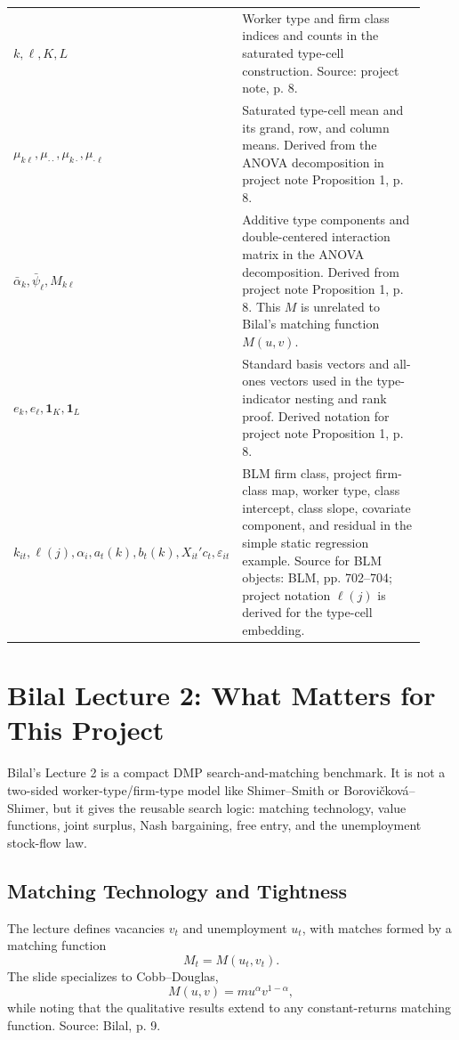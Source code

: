 \documentclass[11pt]{article}
\newcommand{\1}{\mathbf{1}}
\begin{document}
\begin{center}
\begin{tabular}{>{\raggedright\arraybackslash}p{0.24\linewidth}
                >{\raggedright\arraybackslash}p{0.68\linewidth}}
$k,\ell,K,L$ & Worker type and firm class indices and counts in the saturated type-cell construction. Source: project note, p. 8. \\
$\mu_{k\ell},\mu_{\cdot\cdot},\mu_{k\cdot},\mu_{\cdot\ell}$ & Saturated type-cell mean and its grand, row, and column means. Derived from the ANOVA decomposition in project note Proposition 1, p. 8. \\
$\bar\alpha_k,\bar\psi_\ell,M_{k\ell}$ & Additive type components and double-centered interaction matrix in the ANOVA decomposition. Derived from project note Proposition 1, p. 8. This $M$ is unrelated to Bilal's matching function $M(u,v)$. \\
$e_k,e_\ell,\1_K,\1_L$ & Standard basis vectors and all-ones vectors used in the type-indicator nesting and rank proof. Derived notation for project note Proposition 1, p. 8. \\
$k_{it},\ell(j),\alpha_i,a_t(k),b_t(k),X_{it}'c_t,\varepsilon_{it}$ & BLM firm class, project firm-class map, worker type, class intercept, class slope, covariate component, and residual in the simple static regression example. Source for BLM objects: BLM, pp. 702--704; project notation $\ell(j)$ is derived for the type-cell embedding. \\
\bottomrule
\end{tabular}
\end{center}

\section{Bilal Lecture 2: What Matters for This Project}

Bilal's Lecture 2 is a compact DMP search-and-matching benchmark. It is not a
two-sided worker-type/firm-type model like Shimer--Smith or
Borovi\v{c}kov\'a--Shimer, but it gives the reusable search logic: matching
technology, value functions, joint surplus, Nash bargaining, free entry, and
the unemployment stock-flow law.

\subsection{Matching Technology and Tightness}

The lecture defines vacancies $v_t$ and unemployment $u_t$, with matches formed
by a matching function
\[
M_t=M(u_t,v_t).
\]
The slide specializes to Cobb--Douglas,
\[
M(u,v)=m u^\alpha v^{1-\alpha},
\]
while noting that the qualitative results extend to any constant-returns
matching function. Source: Bilal, p. 9.
\end{document}
